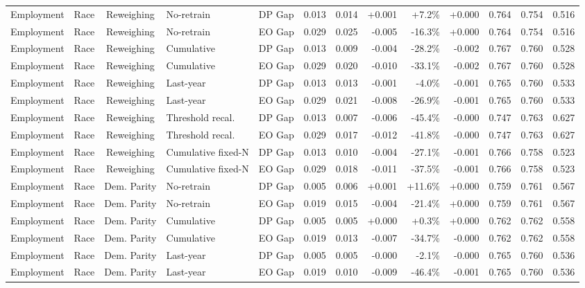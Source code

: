 \begin{longtable}{llcllrrrrrrrr}
Employment & Race & Reweighing & No-retrain & DP Gap & 0.013 & 0.014 & +0.001 & +7.2\% & +0.000 & 0.764 & 0.754 & 0.516 \\
Employment & Race & Reweighing & No-retrain & EO Gap & 0.029 & 0.025 & -0.005 & -16.3\% & +0.000 & 0.764 & 0.754 & 0.516 \\
Employment & Race & Reweighing & Cumulative & DP Gap & 0.013 & 0.009 & -0.004 & -28.2\% & -0.002 & 0.767 & 0.760 & 0.528 \\
Employment & Race & Reweighing & Cumulative & EO Gap & 0.029 & 0.020 & -0.010 & -33.1\% & -0.002 & 0.767 & 0.760 & 0.528 \\
Employment & Race & Reweighing & Last-year & DP Gap & 0.013 & 0.013 & -0.001 & -4.0\% & -0.001 & 0.765 & 0.760 & 0.533 \\
Employment & Race & Reweighing & Last-year & EO Gap & 0.029 & 0.021 & -0.008 & -26.9\% & -0.001 & 0.765 & 0.760 & 0.533 \\
Employment & Race & Reweighing & Threshold recal. & DP Gap & 0.013 & 0.007 & -0.006 & -45.4\% & -0.000 & 0.747 & 0.763 & 0.627 \\
Employment & Race & Reweighing & Threshold recal. & EO Gap & 0.029 & 0.017 & -0.012 & -41.8\% & -0.000 & 0.747 & 0.763 & 0.627 \\
Employment & Race & Reweighing & Cumulative fixed-N & DP Gap & 0.013 & 0.010 & -0.004 & -27.1\% & -0.001 & 0.766 & 0.758 & 0.523 \\
Employment & Race & Reweighing & Cumulative fixed-N & EO Gap & 0.029 & 0.018 & -0.011 & -37.5\% & -0.001 & 0.766 & 0.758 & 0.523 \\
Employment & Race & Dem. Parity & No-retrain & DP Gap & 0.005 & 0.006 & +0.001 & +11.6\% & +0.000 & 0.759 & 0.761 & 0.567 \\
Employment & Race & Dem. Parity & No-retrain & EO Gap & 0.019 & 0.015 & -0.004 & -21.4\% & +0.000 & 0.759 & 0.761 & 0.567 \\
Employment & Race & Dem. Parity & Cumulative & DP Gap & 0.005 & 0.005 & +0.000 & +0.3\% & +0.000 & 0.762 & 0.762 & 0.558 \\
Employment & Race & Dem. Parity & Cumulative & EO Gap & 0.019 & 0.013 & -0.007 & -34.7\% & -0.000 & 0.762 & 0.762 & 0.558 \\
Employment & Race & Dem. Parity & Last-year & DP Gap & 0.005 & 0.005 & -0.000 & -2.1\% & -0.000 & 0.765 & 0.760 & 0.536 \\
Employment & Race & Dem. Parity & Last-year & EO Gap & 0.019 & 0.010 & -0.009 & -46.4\% & -0.001 & 0.765 & 0.760 & 0.536 \\

\end{longtable}

